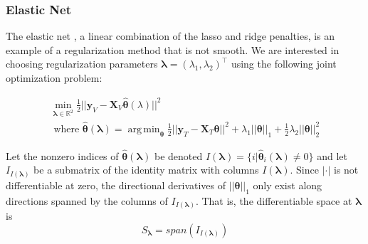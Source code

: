 \documentclass[10pt,letterpaper]{article}
\DeclareMathOperator*{\argmin}{arg\,min}
\begin{document}
%



\subsubsection{Elastic Net}

The elastic net \citep{zou2003regression}, a linear combination of the lasso and ridge penalties, is an example of a regularization method that is not smooth. We are interested in choosing regularization parameters $\boldsymbol{\lambda} = (\lambda_1, \lambda_2)^\top$ using the following joint optimization problem:

\begin{equation}
\begin{array}{c}
\min_{\boldsymbol{\lambda} \in \mathbb{R}^2} \frac{1}{2} \lvert\lvert \boldsymbol{y}_V - \boldsymbol{X}_V \hat{\boldsymbol{\theta}} (\lambda) \rvert\rvert ^2 \\
\text{ where }
\hat{\boldsymbol{\theta}} (\boldsymbol{\lambda}) = \argmin_{\boldsymbol{\theta}} \frac{1}{2} \lvert\lvert \boldsymbol{y}_T - \boldsymbol{X}_T \boldsymbol{\theta} \rvert\rvert ^2
+ \lambda_1 \lvert\lvert \boldsymbol{\theta} \rvert \rvert_1
+ \frac{1}{2}\lambda_2 \lvert\lvert \boldsymbol{\theta} \rvert \rvert_2^2
\end{array}
\end{equation}

Let the nonzero indices of $\hat{\boldsymbol{\theta}}(\boldsymbol{\lambda})$ be denoted $I(\boldsymbol\lambda) = \{i | \hat{\boldsymbol{\theta}}_i(\boldsymbol\lambda) \ne 0\}$ and let $I_{I(\boldsymbol \lambda)}$ be a submatrix of the identity matrix with columns $I(\boldsymbol\lambda)$. Since $|\cdot|$ is not differentiable at zero, the directional derivatives of $||\boldsymbol \theta||_1$ only exist along directions spanned by the columns of $I_{I(\boldsymbol \lambda)}$. That is, the differentiable space at $\boldsymbol \lambda$ is
\begin{equation}
S_{\boldsymbol{\lambda}} = span(I_{I(\boldsymbol \lambda)})
\end{equation}
\end{document}
